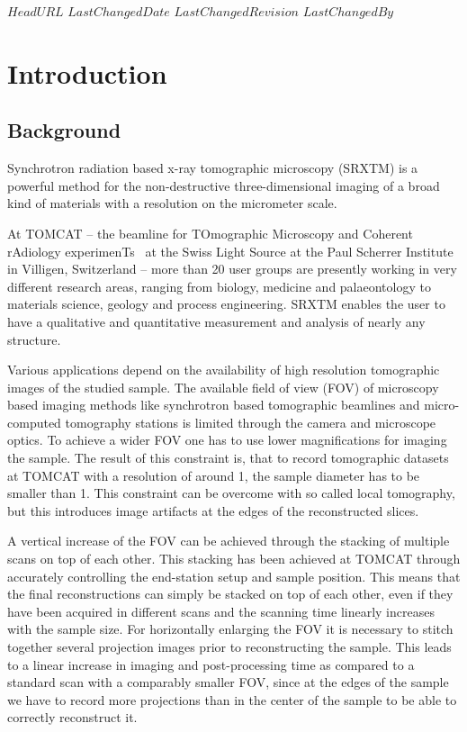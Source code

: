 \svnidlong
{$HeadURL$}
{$LastChangedDate$}
{$LastChangedRevision$}
{$LastChangedBy$}
\section{Introduction}
\subsection{Background}
Synchrotron radiation based x-ray tomographic microscopy (SRXTM) is a powerful method for the non-destructive three-dimensional imaging of a broad kind of materials with a resolution on the micrometer scale.

At TOMCAT -- the beamline for TOmographic Microscopy and Coherent rAdiology experimenTs~\cite{Stampanoni2007} at the Swiss Light Source at the Paul Scherrer Institute in Villigen, Switzerland -- more than 20 user groups are presently working in very different research areas, ranging from biology, medicine and palaeontology to materials science, geology and process engineering. SRXTM enables the user to have a qualitative and quantitative measurement and analysis of nearly any structure.

Various applications depend on the availability of high resolution tomographic images of the studied sample. The available field of view (FOV) of microscopy based imaging methods like synchrotron based tomographic beamlines and micro-computed tomography stations is limited through the camera and microscope optics. To achieve a wider FOV one has to use lower magnifications for imaging the sample. The result of this constraint is, that to record tomographic datasets at TOMCAT with a resolution of around \unit{1}{\micro\meter}, the sample diameter has to be smaller than \unit{1}{\milli\meter}. This constraint can be overcome with so called local tomography, but this introduces image artifacts at the edges of the reconstructed slices.

A vertical increase of the FOV can be achieved through the stacking of multiple scans on top of each other. This stacking has been achieved at TOMCAT through accurately controlling the end-station setup and sample position. This means that the final reconstructions can simply be stacked on top of each other, even if they have been acquired in different scans and the scanning time linearly increases with the sample size. For horizontally enlarging the FOV it is necessary to stitch together several projection images prior to reconstructing the sample. This leads to a linear increase in imaging and post-processing time as compared to a standard scan with a comparably smaller FOV, since at the edges of the sample we have to record more projections than in the center of the sample to be able to correctly reconstruct it. 